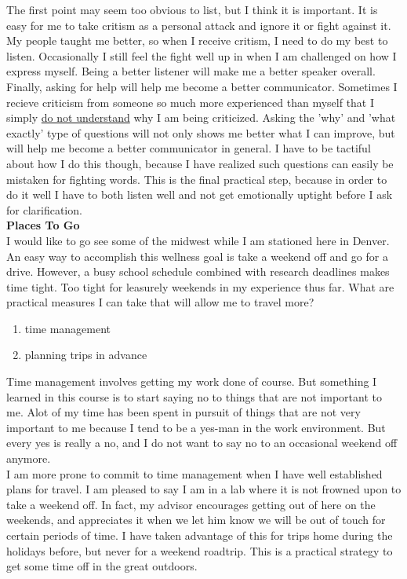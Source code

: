 \documentclass[12pt]{article}
\newcommand{\sectiontitle}[1]{ \noindent \textbf{\large #1} \\[-4mm] }
\begin{document}
  The first point may seem too obvious to list, but I think it is important. It is easy for me
  to take critism as a personal attack and ignore it or fight against it. My people taught me better,
  so when I receive critism, I need to do my best to listen. Occasionally I still feel the
  fight well up in when I am challenged on how I express myself. Being a better listener will 
  make me a better speaker overall. \\

  Finally, asking for help will help me become a better communicator. Sometimes I recieve
  criticism from someone so much more experienced than myself that I simply \underline{
  do not understand} why I am being criticized. Asking the 'why' and 'what exactly' type of
  questions will not only shows me better what I can improve, but will help me become a better
  communicator in general. I have to be tactiful about how I do this though, because I have
  realized such questions can easily be mistaken for fighting words. This is the final practical
  step, because in order to do it well I have to both listen well and not get emotionally
  uptight before I ask for clarification. \\

  \sectiontitle{Places To Go}

  I would like to go see some of the midwest while I am stationed here in Denver. An
  easy way to accomplish this wellness goal is take a weekend off and go for a drive.
  However, a busy school schedule combined with research deadlines makes time tight.
  Too tight for leasurely weekends in my experience thus far. What are practical measures
  I can take that will allow me to travel more?

  \begin{enumerate}
    \item time management
    \item planning trips in advance
  \end{enumerate}
  
  Time management involves getting my work done of course. But something I learned in this course
  is to start saying no to things that are not important to me. Alot of my time has been spent
  in pursuit of things that are not very important to me because I tend to be a yes-man in the
  work environment. But every yes is really a no, and I do not want to say no to an occasional
  weekend off anymore. \\

  I am more prone to commit to time management when I have well established plans for travel.
  I am pleased to say I am in a lab where it is not frowned upon to take a weekend off. In fact,
  my advisor encourages getting out of here on the weekends, and appreciates it when we let
  him know we will be out of touch for certain periods of time. I have taken advantage of this 
  for trips home during the holidays before, but never for a weekend roadtrip. This is a practical
  strategy to get some time off in the great outdoors. \\
\end{document}
